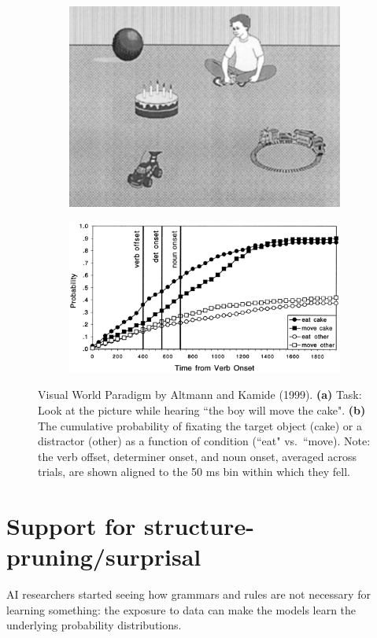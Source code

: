 \begin{figure}[!ht]
    \centering
    \captionsetup{width=.8\linewidth}
    \begin{subfigure}{.42\textwidth}
        \centering
        \captionsetup{width=.8\linewidth}
        \includegraphics[width=.9\linewidth]{images/vwp.png}
        \caption{}
        \label{fig:vwp}
    \end{subfigure}
    \begin{subfigure}{.56\textwidth}
        \centering
        \captionsetup{width=.8\linewidth}
        \includegraphics[width=.9\linewidth]{images/vwp_2.png}
        \caption{}
        \label{fig:vwp_2}
    \end{subfigure}
    \caption{Visual World Paradigm by Altmann and Kamide (1999). \textbf{(a)} Task: Look at the picture while hearing ``the boy will move the cake". \textbf{(b)} The cumulative probability of fixating the target object (cake) or a distractor (other) as a function of condition (``eat" vs.~``move). Note: the verb offset, determiner onset, and noun onset, averaged across trials, are shown aligned to the 50 ms bin within which they fell.}
    \label{fig:vwp_1}
\end{figure}

\section{Support for structure-pruning/surprisal}
AI researchers started seeing how grammars and rules are not necessary for learning something: the exposure to data can make the models learn the underlying probability distributions.
